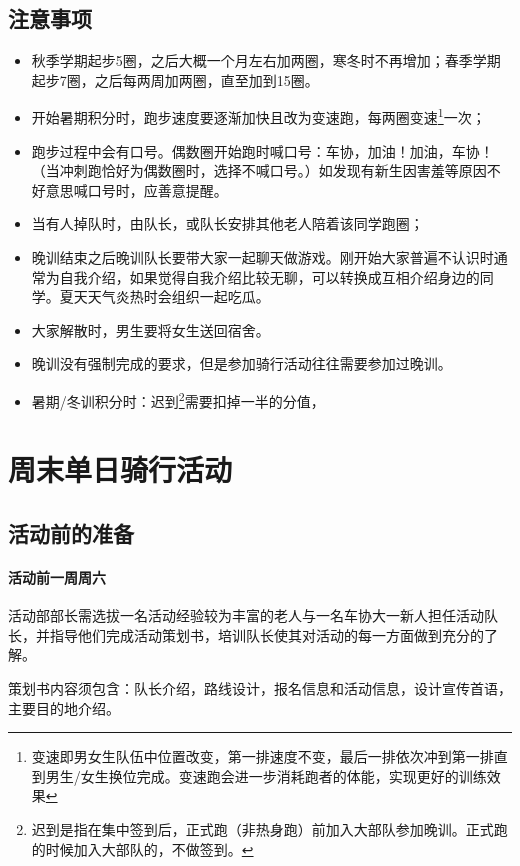 \documentclass{ctexbook}
\begin{document}
\subsection{注意事项}
\begin{itemize}
    \item 秋季学期起步5圈，之后大概一个月左右加两圈，寒冬时不再增加；春季学期起步7圈，之后每两周加两圈，直至加到15圈。
    \item 开始暑期积分时，跑步速度要逐渐加快且改为变速跑，每两圈变速\footnote{变速即男女生队伍中位置改变，第一排速度不变，最后一排依次冲到第一排直到男生/女生换位完成。变速跑会进一步消耗跑者的体能，实现更好的训练效果}一次；
    \item 跑步过程中会有口号。偶数圈开始跑时喊口号：车协，加油！加油，车协！（当冲刺跑恰好为偶数圈时，选择不喊口号。）如发现有新生因害羞等原因不好意思喊口号时，应善意提醒。
    \item 当有人掉队时，由队长，或队长安排其他老人陪着该同学跑圈；
    \item 晚训结束之后晚训队长要带大家一起聊天做游戏。刚开始大家普遍不认识时通常为自我介绍，如果觉得自我介绍比较无聊，可以转换成互相介绍身边的同学。夏天天气炎热时会组织一起吃瓜。  
    \item 大家解散时，男生要将女生送回宿舍。
    \item 晚训没有强制完成的要求，但是参加骑行活动往往需要参加过晚训。
    \item 暑期/冬训积分时：迟到\footnote{迟到是指在集中签到后，正式跑（非热身跑）前加入大部队参加晚训。正式跑的时候加入大部队的，不做签到。}需要扣掉一半的分值，
\end{itemize}

\section{周末单日骑行活动}

\subsection{活动前的准备}

\paragraph{活动前一周周六}

活动部部长需选拔一名活动经验较为丰富的老人与一名车协大一新人担任活动队长，并指导他们完成活动策划书，培训队长使其对活动的每一方面做到充分的了解。

策划书内容须包含：队长介绍，路线设计，报名信息和活动信息，设计宣传首语，主要目的地介绍。
\end{document}
